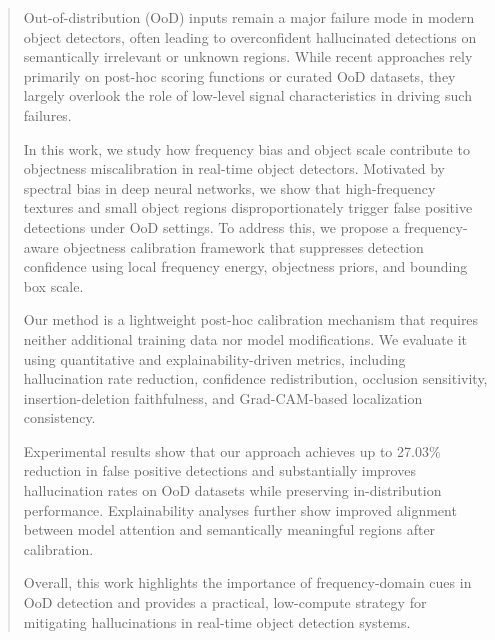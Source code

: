 \begin{abstract}
Out-of-distribution (OoD) inputs remain a major failure mode in modern object detectors, often leading to overconfident hallucinated detections on semantically irrelevant or unknown regions. While recent approaches rely primarily on post-hoc scoring functions or curated OoD datasets, they largely overlook the role of low-level signal characteristics in driving such failures.

In this work, we study how frequency bias and object scale contribute to objectness miscalibration in real-time object detectors. Motivated by spectral bias in deep neural networks, we show that high-frequency textures and small object regions disproportionately trigger false positive detections under OoD settings. To address this, we propose a frequency-aware objectness calibration framework that suppresses detection confidence using local frequency energy, objectness priors, and bounding box scale.

Our method is a lightweight post-hoc calibration mechanism that requires neither additional training data nor model modifications. We evaluate it using quantitative and explainability-driven metrics, including hallucination rate reduction, confidence redistribution, occlusion sensitivity, insertion-deletion faithfulness, and Grad-CAM-based localization consistency.

Experimental results show that our approach achieves up to 27.03\% reduction in false positive detections and substantially improves hallucination rates on OoD datasets while preserving in-distribution performance. Explainability analyses further show improved alignment between model attention and semantically meaningful regions after calibration.

Overall, this work highlights the importance of frequency-domain cues in OoD detection and provides a practical, low-compute strategy for mitigating hallucinations in real-time object detection systems.
\end{abstract}
